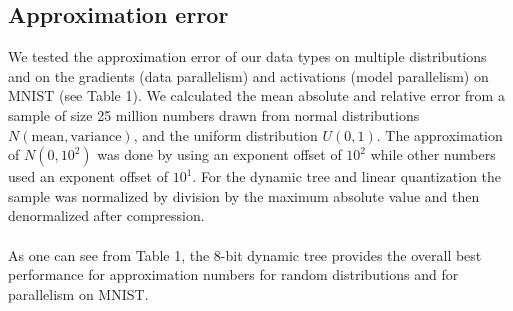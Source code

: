 \documentclass{article} %
\begin{document}
\subsection{Approximation error}

We tested the approximation error of our data types on multiple distributions and on the gradients (data parallelism) and activations (model parallelism) on MNIST (see Table 1). We calculated the mean absolute and relative error from a sample of size 25 million numbers drawn from normal distributions $N(\mbox{mean},\mbox{variance})$, and the uniform distribution $U(0,1)$. The approximation of $N(0,10^2)$ was done by using an exponent offset of $10^2$ while other numbers used an exponent offset of $10^1$. For the dynamic tree and linear quantization the sample was normalized by division by the maximum absolute value and then denormalized after compression. \\\\
As one can see from Table 1, the 8-bit dynamic tree provides the overall best performance for approximation numbers for random distributions and for parallelism on MNIST. 
\end{document}
